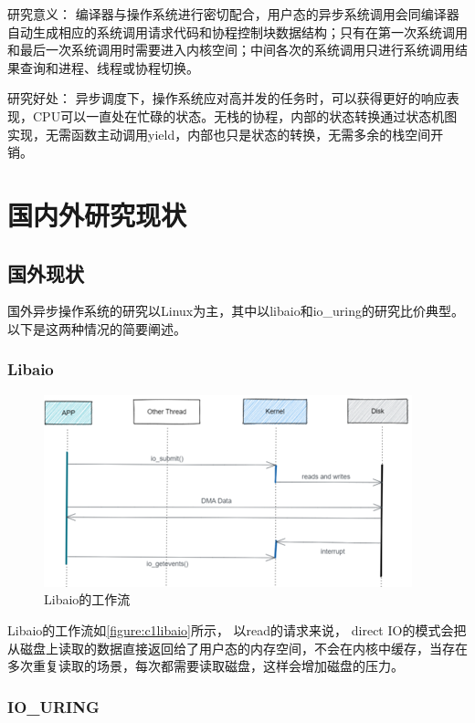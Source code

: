 研究意义： 编译器与操作系统进行密切配合，用户态的异步系统调用会同编译器自动生成相应的系统调用请求代码和协程控制块数据结构；只有在第一次系统调用和最后一次系统调用时需要进入内核空间；中间各次的系统调用只进行系统调用结果查询和进程、线程或协程切换。

研究好处： 异步调度下，操作系统应对高并发的任务时，可以获得更好的响应表现，CPU可以一直处在忙碌的状态。无栈的协程，内部的状态转换通过状态机图实现，无需函数主动调用yield，内部也只是状态的转换，无需多余的栈空间开销。

\section{国内外研究现状}

\subsection{国外现状}
国外异步操作系统的研究以Linux为主，其中以libaio和io\_uring的研究比价典型。以下是这两种情况的简要阐述。

\subsubsection{Libaio}

\begin{figure}[htb]
    \figureCapSet
    \centering
    \includegraphics[width=.8\linewidth]{figure/c1/libaio.png}
    \caption{Libaio的工作流}
    \label{figure:c1libaio}
\end{figure}

Libaio的工作流如\autoref{figure:c1libaio}所示， 以read的请求来说， direct IO的模式会把从磁盘上读取的数据直接返回给了用户态的内存空间，不会在内核中缓存，当存在多次重复读取的场景，每次都需要读取磁盘，这样会增加磁盘的压力。


\subsubsection{IO\_URING}

